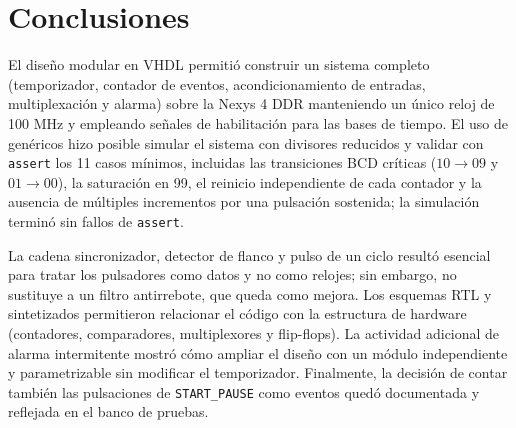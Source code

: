 \documentclass[letterpaper,12pt]{article}
\begin{document}
\section{Conclusiones}
El diseño modular en VHDL permitió construir un sistema completo (temporizador, contador de eventos, acondicionamiento de entradas, multiplexación y alarma) sobre la Nexys 4 DDR manteniendo un único reloj de 100 MHz y empleando señales de habilitación para las bases de tiempo. El uso de genéricos hizo posible simular el sistema con divisores reducidos y validar con \texttt{assert} los 11 casos mínimos, incluidas las transiciones BCD críticas ($10\rightarrow09$ y $01\rightarrow00$), la saturación en 99, el reinicio independiente de cada contador y la ausencia de múltiples incrementos por una pulsación sostenida; la simulación terminó sin fallos de \texttt{assert}.

La cadena sincronizador, detector de flanco y pulso de un ciclo resultó esencial para tratar los pulsadores como datos y no como relojes; sin embargo, no sustituye a un filtro antirrebote, que queda como mejora. Los esquemas RTL y sintetizados permitieron relacionar el código con la estructura de hardware (contadores, comparadores, multiplexores y flip-flops). La actividad adicional de alarma intermitente mostró cómo ampliar el diseño con un módulo independiente y parametrizable sin modificar el temporizador. Finalmente, la decisión de contar también las pulsaciones de \texttt{START\_PAUSE} como eventos quedó documentada y reflejada en el banco de pruebas.
\end{document}
